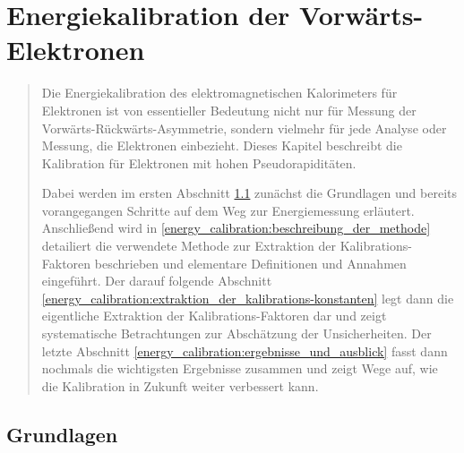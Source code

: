 


%
\chapter{Energiekalibration der Vorwärts-Elektronen}
\label{energy_calibration}

\begin{quote}
    Die Energiekalibration des elektromagnetischen Kalorimeters für Elektronen 
    ist von essentieller Bedeutung nicht nur für Messung der
    Vorwärts-Rückwärts-Asymmetrie, sondern vielmehr für jede Analyse oder
    Messung, die Elektronen einbezieht. Dieses Kapitel beschreibt die
    Kalibration für Elektronen mit hohen Pseudorapiditäten.

    Dabei werden im ersten Abschnitt \ref{energy_calibration:grundlagen}
    zunächst die Grundlagen und bereits vorangegangen Schritte auf dem Weg zur
    Energiemessung erläutert. Anschließend wird in
    \ref{energy_calibration:beschreibung_der_methode} detailiert die verwendete
    Methode zur Extraktion der Kalibrations-Faktoren beschrieben und elementare
    Definitionen und Annahmen eingeführt. Der darauf folgende Abschnitt
    \ref{energy_calibration:extraktion_der_kalibrations-konstanten} legt dann
    die eigentliche Extraktion der Kalibrations-Faktoren dar und zeigt
    systematische Betrachtungen zur Abschätzung der Unsicherheiten. Der letzte
    Abschnitt \ref{energy_calibration:ergebnisse_und_ausblick} fasst dann
    nochmals die wichtigsten Ergebnisse zusammen und zeigt Wege auf, wie die
    Kalibration in Zukunft weiter verbessert kann.
\end{quote}



%
\section{Grundlagen}
\label{energy_calibration:grundlagen}

